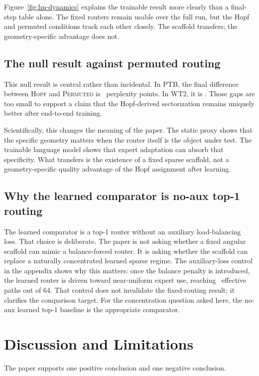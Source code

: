 \documentclass[10pt,letterpaper]{article}
\begin{document}
Figure~\ref{fig:lm-dynamics} explains the trainable result more clearly than a final-step table alone. The fixed routers remain usable over the full run, but the Hopf and permuted conditions track each other closely. The scaffold transfers; the geometry-specific advantage does not.

\subsection{The null result against permuted routing}
\label{sec:null}
This null result is central rather than incidental. In PTB, the final difference between \textsc{Hopf} and \textsc{Permuted} is \PaperPTBHopfPermDelta\ perplexity points. In WT2, it is \PaperWTTwoHopfPermDelta. Those gaps are too small to support a claim that the Hopf-derived sectorization remains uniquely better after end-to-end training.

Scientifically, this changes the meaning of the paper. The static proxy shows that the specific geometry matters when the router itself is the object under test. The trainable language model shows that expert adaptation can absorb that specificity. What transfers is the existence of a fixed sparse scaffold, not a geometry-specific quality advantage of the Hopf assignment after learning.

\subsection{Why the learned comparator is no-aux top-1 routing}
The learned comparator is a top-1 router without an auxiliary load-balancing loss. That choice is deliberate. The paper is not asking whether a fixed angular scaffold can mimic a balance-forced router. It is asking whether the scaffold can replace a naturally concentrated learned sparse regime. The auxiliary-loss control in the appendix shows why this matters: once the balance penalty is introduced, the learned router is driven toward near-uniform expert use, reaching \PaperAuxSparseEff\ effective paths out of 64. That control does not invalidate the fixed-routing result; it clarifies the comparison target. For the concentration question asked here, the no-aux learned top-1 baseline is the appropriate comparator.

\section{Discussion and Limitations}
The paper supports one positive conclusion and one negative conclusion.
\end{document}
